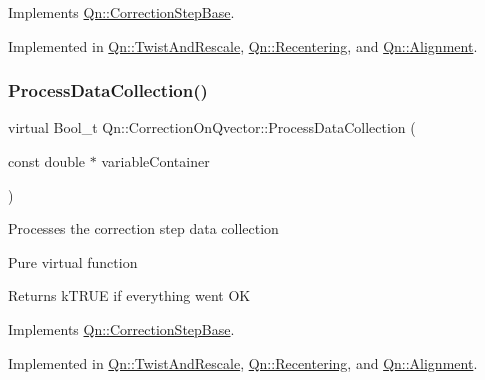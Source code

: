 Implements \mbox{\hyperlink{classQn_1_1CorrectionStepBase_a773ff3bbe5e7c8bcfb11a4f4138af1e1}{Qn\+::\+Correction\+Step\+Base}}.



Implemented in \mbox{\hyperlink{classQn_1_1TwistAndRescale_a3bc16721deb0f73dbfcf0ae6cabe5b54}{Qn\+::\+Twist\+And\+Rescale}}, \mbox{\hyperlink{classQn_1_1Recentering_a78bd432f4eb1f13cf846176426dbe579}{Qn\+::\+Recentering}}, and \mbox{\hyperlink{classQn_1_1Alignment_a57b815d9ce4d0ae4f94ff6cb46eb2514}{Qn\+::\+Alignment}}.

\mbox{\label{classQn_1_1CorrectionOnQvector_a2c0a668d885b5a42503869303c859a0b}} 
\subsubsection{\texorpdfstring{Process\+Data\+Collection()}{ProcessDataCollection()}}
{\footnotesize\ttfamily virtual Bool\+\_\+t Qn\+::\+Correction\+On\+Qvector\+::\+Process\+Data\+Collection (\begin{DoxyParamCaption}\item[{const double $\ast$}]{variable\+Container }\end{DoxyParamCaption})\hspace{0.3cm}{\ttfamily [pure virtual]}}

Processes the correction step data collection

Pure virtual function \begin{DoxyReturn}{Returns}
k\+T\+R\+UE if everything went OK 
\end{DoxyReturn}


Implements \mbox{\hyperlink{classQn_1_1CorrectionStepBase_a77005ff85ae351cb290fee4adb41c029}{Qn\+::\+Correction\+Step\+Base}}.



Implemented in \mbox{\hyperlink{classQn_1_1TwistAndRescale_ac0392e263ff658b876821ac06d5b2eff}{Qn\+::\+Twist\+And\+Rescale}}, \mbox{\hyperlink{classQn_1_1Recentering_a1e3efc8b261021b21732474eb7afa3ca}{Qn\+::\+Recentering}}, and \mbox{\hyperlink{classQn_1_1Alignment_af071fa4f51958ecfec6e6c58a7d84c84}{Qn\+::\+Alignment}}.

\mbox{\label{classQn_1_1CorrectionOnQvector_a322860c299f0ca1db46ddd57c0828ba1}} 
